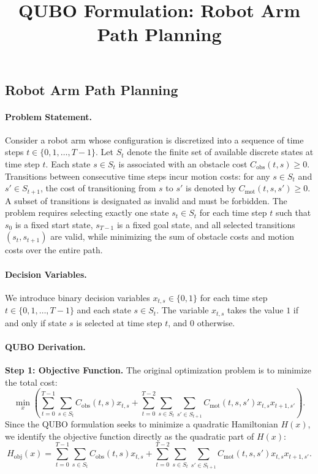 \documentclass[12pt]{article}
\title{QUBO Formulation: Robot Arm Path Planning}
\date{}
\begin{document}
\maketitle

\subsection*{Robot Arm Path Planning}

\paragraph{Problem Statement.}
Consider a robot arm whose configuration is discretized into a sequence of time steps $t \in \{0, 1, \dots, T-1\}$. Let $S_t$ denote the finite set of available discrete states at time step $t$. Each state $s \in S_t$ is associated with an obstacle cost $C_{\text{obs}}(t,s) \geq 0$. Transitions between consecutive time steps incur motion costs: for any $s \in S_t$ and $s' \in S_{t+1}$, the cost of transitioning from $s$ to $s'$ is denoted by $C_{\text{mot}}(t,s,s') \geq 0$. A subset of transitions is designated as invalid and must be forbidden. The problem requires selecting exactly one state $s_t \in S_t$ for each time step $t$ such that $s_0$ is a fixed start state, $s_{T-1}$ is a fixed goal state, and all selected transitions $(s_t, s_{t+1})$ are valid, while minimizing the sum of obstacle costs and motion costs over the entire path.

\paragraph{Decision Variables.}
We introduce binary decision variables $x_{t,s} \in \{0,1\}$ for each time step $t \in \{0, 1, \dots, T-1\}$ and each state $s \in S_t$. The variable $x_{t,s}$ takes the value $1$ if and only if state $s$ is selected at time step $t$, and $0$ otherwise.

\paragraph{QUBO Derivation.}

\textbf{Step 1: Objective Function.}
The original optimization problem is to minimize the total cost:
\begin{equation}
\min_{x} \left( \sum_{t=0}^{T-1} \sum_{s \in S_t} C_{\text{obs}}(t,s) x_{t,s} + \sum_{t=0}^{T-2} \sum_{s \in S_t} \sum_{s' \in S_{t+1}} C_{\text{mot}}(t,s,s') x_{t,s} x_{t+1,s'} \right).
\end{equation}
Since the QUBO formulation seeks to minimize a quadratic Hamiltonian $H(x)$, we identify the objective function directly as the quadratic part of $H(x)$:
\begin{equation}
H_{\text{obj}}(x) = \sum_{t=0}^{T-1} \sum_{s \in S_t} C_{\text{obs}}(t,s) x_{t,s} + \sum_{t=0}^{T-2} \sum_{s \in S_t} \sum_{s' \in S_{t+1}} C_{\text{mot}}(t,s,s') x_{t,s} x_{t+1,s'}.
\end{equation}
\end{document}
